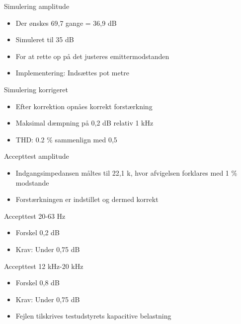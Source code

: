 \documentclass{beamer}
\begin{document}

\begin{frame}{Simulering amplitude}
\begin{itemize}
\item Der ønskes 69,7 gange = 36,9 dB
\item Simuleret til 35 dB
\item For at rette op på det justeres emittermodstanden
\item Implementering: Indsættes pot metre
\end{itemize}
\end{frame}

\begin{frame}{Simulering korrigeret}
\begin{itemize}
\item Efter korrektion opnåes korrekt forstærkning
\item Maksimal dæmpning på 0,2 dB relativ 1 kHz
\item THD: 0.2 \% sammenlign med 0,5
\end{itemize}
\end{frame}

\begin{frame}{Accepttest amplitude}
\begin{itemize}
\item Indgangsimpedansen måltes til 22,1 k, hvor afvigelsen forklares med 1 \% modstande
\item Forstærkningen er indstillet og dermed korrekt
\end{itemize}
\end{frame}

\begin{frame}{Accepttest 20-63 Hz}
\begin{itemize}
\item Forskel 0,2 dB
\item Krav: Under 0,75 dB
\end{itemize}
\end{frame}

\begin{frame}{Accepttest 12 kHz-20 kHz}
\begin{itemize}
\item Forskel 0,8 dB
\item Krav: Under 0,75 dB
\item Fejlen tilskrives testudstyrets kapacitive belastning
\end{itemize}
\end{frame}
\end{document}
